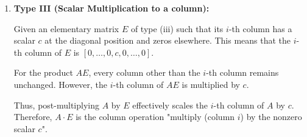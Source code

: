 \documentclass{report}
\begin{document}
{\begin{enumerate}
		      Consider the matrix product \( AE \). The \( k \)-th column of \( AE \) for \( k \neq i,j \) remains unchanged, since it will dot with columns of \( E \) filled with zeros except for the one at its own position. However, the \( i \)-th column of \( AE \) will be the \( j \)-th column of \( A \) and vice-versa.

		      Thus, post-multiplying \( A \) by \( E \) effectively interchanges the \( i \)-th and \( j \)-th columns of \( A \). Therefore, \( A \cdot E \) is the column operation "interchange (column \( i \)) with (column \( j \))".
		\item \textbf{Type III (Scalar Multiplication to a column):}

		      Given an elementary matrix \( E \) of type (iii) such that its \( i \)-th column has a scalar \( c \) at the diagonal position and zeros elsewhere. This means that the \( i \)-th column of \( E \) is \( [0, \dots, 0, c, 0, \dots, 0] \).

		      For the product \( AE \), every column other than the \( i \)-th column remains unchanged. However, the \( i \)-th column of \( AE \) is multiplied by \( c \).

		      Thus, post-multiplying \( A \) by \( E \) effectively scales the \( i \)-th column of \( A \) by \( c \). Therefore, \( A \cdot E \) is the column operation "multiply (column \( i \)) by the nonzero scalar \( c \)".
	\end{enumerate}

}
\end{document}
